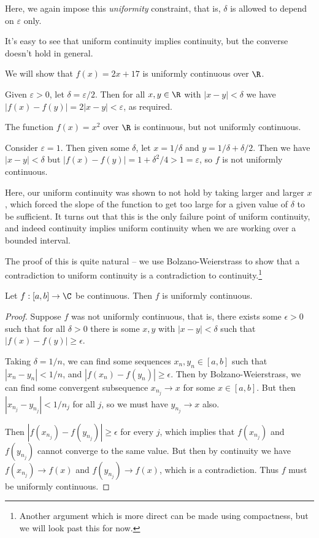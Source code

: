 Here, we again impose this \emph{uniformity} constraint, that is, $\delta$ is allowed to depend on $\varepsilon$ only. 

It's easy to see that uniform continuity implies continuity, but the converse doesn't hold in general.

\begin{example}
    We will show that $f(x) = 2x + 17$ is uniformly continuous over $\R$. 

    Given $\varepsilon > 0$, let $\delta = \varepsilon / 2$. Then for all $x, y \in \R$ with $|x - y| < \delta$ we have $|f(x) - f(y)| = 2|x - y| < \varepsilon$, as required.
\end{example}

\begin{example}
    The function $f(x) = x^2$ over $\R$ is continuous, but not uniformly continuous. 

    Consider $\varepsilon = 1$. Then given some $\delta$, let $x = 1/\delta$ and $y = 1/\delta + \delta/2$. Then we have $|x - y| < \delta$ but $|f(x) - f(y)| = 1 + \delta^2/4 > 1 = \varepsilon$, so $f$ is not uniformly continuous.
\end{example}

Here, our uniform continuity was shown to not hold by taking larger and larger $x$, which forced the slope of the function to get too large for a given value of $\delta$ to be sufficient. It turns out that this is the only failure point of uniform continuity, and indeed continuity implies uniform continuity when we are working over a bounded interval.

The proof of this is quite natural -- we use Bolzano-Weierstrass to show that a contradiction to uniform continuity is a contradiction to continuity.\footnote{Another argument which is more direct can be made using compactness, but we will look past this for now.}

\begin{theorem}
    Let $f: [a, b] \rightarrow \C$ be continuous. Then $f$ is uniformly continuous.
\end{theorem}
\begin{proof}
	Suppose $f$ was not uniformly continuous, that is, there exists some $\epsilon > 0$ such that for all $\delta > 0$ there is some $x, y$ with $|x - y| < \delta$ such that $|f(x) - f(y)| \geq \epsilon$.

	Taking $\delta = 1/n$, we can find some sequences $x_n, y_n \in [a, b]$ such that $|x_n - y_n| < 1/n$, and $|f(x_n) - f(y_n)| \geq \epsilon$. Then by Bolzano-Weierstrass, we can find some convergent subsequence $x_{n_j} \rightarrow x$ for some $x \in [a, b]$. But then $|x_{n_j} - y_{n_j}| < 1/n_j$ for all $j$, so we must have $y_{n_j} \rightarrow x$ also.

	Then $|f(x_{n_j}) - f(y_{n_j})| \geq \epsilon$ for every $j$, which implies that $f(x_{n_j})$ and $f(y_{n_j})$ cannot converge to the same value. But then by continuity we have $f(x_{n_j}) \rightarrow f(x)$ and $f(y_{n_j}) \rightarrow f(x)$, which is a contradiction. Thus $f$ must be uniformly continuous.
\end{proof}

